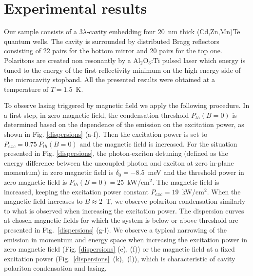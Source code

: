 \documentclass[amssymb,prb,twocolumn,floats,amsmath]{revtex4}
\begin{document}
\section{Experimental results}

Our sample consists of a 3$\lambda$-cavity embedding four 20~nm thick (Cd,Zn,Mn)Te quantum wells.\cite{Rousset_APL2015} The cavity is surrounded by distributed Bragg reflectors consisting of 22 pairs for the bottom mirror and 20 pairs for the top one.\cite{Rousset_JCG2013, Rousset_JCG2014} Polaritons are created non resonantly by a Al$_2$O$_3$:Ti pulsed laser which energy is tuned to the energy of the first reflectivity minimum on the high energy side of the microcavity stopband. All the presented results were obtained at a temperature of $T=1.5$~K.

To observe lasing triggered by magnetic field we apply the following procedure. In a first step, in zero magnetic field, the condensation threshold $P_{th}(B=0)$ is determined based on the dependence of the emission on the excitation power, as shown in Fig. \ref{dispersions} (a-f). Then the excitation power is set to $P_{exc}=0.75\ P_{th}(B=0)$ and the magnetic field is increased. For the situation presented in Fig. \ref{dispersions}, the photon-exciton detuning (defined as the energy difference between the uncoupled photon and exciton at zero in-plane momentum) in zero magnetic field is $\delta_0 = -8.5$~meV and the threshold power in zero magnetic field is $P_{th}(B=0)=25$~kW/cm$^2$. The magnetic field is increased, keeping the excitation power constant $P_{exc}=19$~kW/cm$^2$. When the magnetic field increases to $B\approx2$~T, we observe polariton condensation similarly to what is observed when increasing the excitation power. The dispersion curves at chosen magnetic fields for which the system is below or above threshold are presented in Fig.~\ref{dispersions} (g-l). We observe a typical narrowing of the emission in momentum and energy space when increasing the excitation power in zero magnetic field (Fig. \ref{dispersions} (e), (f)) or the magnetic field at a fixed excitation power (Fig.~\ref{dispersions}~(k),~(l)), which is characteristic of cavity polariton condensation and lasing.
\end{document}
